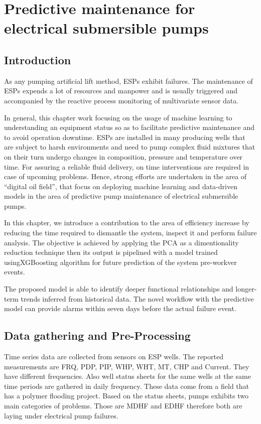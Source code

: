 \chapter{Predictive maintenance for electrical submersible pumps}

\section{Introduction}
As any pumping artificial lift method, \ac{ESP}s exhibit failures. The maintenance of \ac{ESP}s expends a lot of resources and manpower and is usually triggered and accompanied by the reactive process monitoring of multivariate sensor data.

In general, this chapter work focusing on the usage of machine learning to understanding an equipment status so as to facilitate predictive maintenance and to avoid operation downtime. ESPs are installed in many producing wells that are subject to harsh environments and need to pump complex fluid mixtures that on their turn undergo changes in composition, pressure and temperature over time. For assuring a reliable fluid delivery, on time interventions are required in case of upcoming problems. Hence, strong efforts are undertaken in the area of “digital oil field”, that focus on deploying machine learning and data-driven models in the area of predictive pump maintenance of electrical submersible pumps.

In this chapter, we introduce a contribution to the area of efficiency increase by reducing the time required to dismantle the system, inspect it and perform failure analysis. The objective is achieved by applying the \ac{PCA} as a dimentionality reduction technique then its output is pipelined with a model trained using\ac{XGBoosting} algorithm for future prediction of the system pre-workver events.

The proposed model is able to identify deeper functional relationships and longer-term trends inferred from historical data. The novel workflow with the predictive model can provide alarms within seven days before the actual failure event. 

\section{Data gathering and Pre-Processing}

Time series data are collected from sensors on \ac{ESP} wells. The reported measurements are \ac{FRQ}, \ac{PDP}, \ac{PIP}, \ac{WHP}, \ac{WHT}, \ac{MT}, \ac{CHP} and \ac{Current}. They have different frequencies. Also well status sheets for the same wells at the same time periods are gathered in daily frequency. These data come from a field that has a polymer flooding project. Based on the status sheets, pumps exhibits two main categories of problems. Those are \ac{MDHF} and \ac{EDHF} therefore both are laying under electrical pump failures. 

